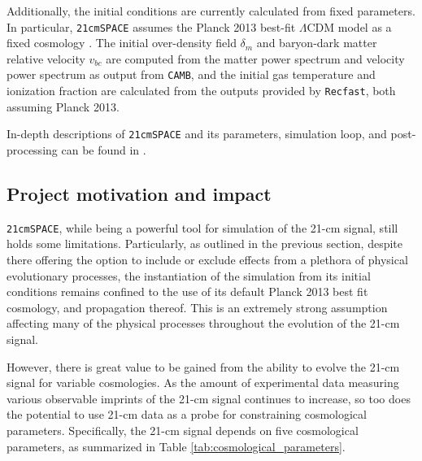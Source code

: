 \documentclass[floats,floatfix,showpacs,amssymb,prd,superscriptaddress,nofootinbib]{revtex4-2} %
\newcommand{\code}{\texttt}
\begin{document}
Additionally, the initial conditions are currently calculated from fixed parameters. In particular, \code{21cmSPACE} assumes the Planck 2013 best-fit $\Lambda$CDM model as a fixed cosmology \citep{Planck2013results}. The initial over-density field $\delta_m$ and baryon-dark matter relative velocity $v_{bc}$ are computed \citep{Fialkov_2012} from the matter power spectrum and velocity power spectrum as output from \code{CAMB}, and the initial gas temperature and ionization fraction are calculated from the outputs provided by \code{Recfast}, both assuming Planck 2013.

In-depth descriptions of \code{21cmSPACE} and its parameters, simulation loop, and post-processing can be found in \citet{Gessey-Jones_2023, Gessey-Jones_2024, gessey-jones_thesis}.

\subsection{Project motivation and impact}

\code{21cmSPACE}, while being a powerful tool for simulation of the 21-cm signal, still holds some limitations. Particularly, as outlined in the previous section, despite there offering the option to include or exclude effects from a plethora of physical evolutionary processes, the instantiation of the simulation from its initial conditions remains confined to the use of its default Planck 2013 best fit cosmology, and propagation thereof. This is an extremely strong assumption affecting many of the physical processes throughout the evolution of the 21-cm signal.

However, there is great value to be gained from the ability to evolve the 21-cm signal for variable cosmologies. As the amount of experimental data measuring various observable imprints of the 21-cm signal continues to increase, so too does the potential to use 21-cm data as a probe for constraining cosmological parameters. Specifically, the 21-cm signal depends on five cosmological parameters, as summarized in Table \ref{tab:cosmological_parameters}.
\end{document}
